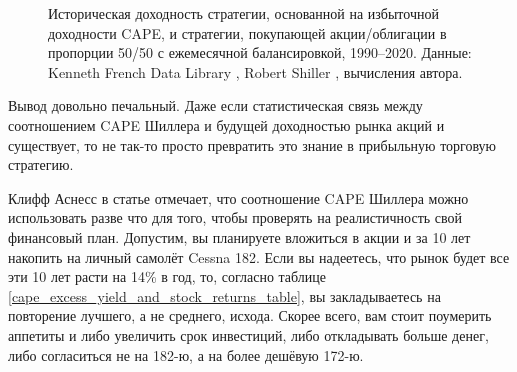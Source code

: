 \begin{figure}[h!]
\caption{Историческая доходность стратегии, основанной на избыточной доходности CAPE, и стратегии, покупающей акции/облигации в пропорции 50/50 с ежемесячной балансировкой, 1990--2020.  Данные: Kenneth French Data Library \cite{kennethFrench}, Robert Shiller \cite{shillerOnline}, вычисления автора.}
\label{cape_strategy_1990}
\end{figure}

Вывод довольно печальный. Даже если статистическая связь между соотношением CAPE Шиллера и будущей доходностью рынка акций и существует, то не так-то просто превратить это знание в прибыльную торговую стратегию. 

Клифф Аснесс в статье \cite{asness2012old} отмечает, что соотношение CAPE Шиллера можно использовать разве что для того, чтобы проверять на реалистичность свой финансовый план. Допустим, вы планируете вложиться в акции и за 10 лет накопить на личный самолёт Cessna 182. Если вы надеетесь, что рынок будет все эти 10 лет расти на 14\% в год, то, согласно таблице \ref{cape_excess_yield_and_stock_returns_table}, вы закладываетесь на повторение лучшего, а не среднего, исхода. Скорее всего, вам стоит поумерить аппетиты и либо увеличить срок инвестиций, либо откладывать больше денег, либо согласиться не на 182-ю, а на более дешёвую 172-ю.

